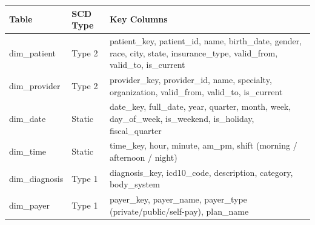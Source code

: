 \documentclass[12pt, a4paper, oneside]{report}
\begin{document}
\begin{longtable}{>{\ttfamily\small}p{2.8cm} p{2cm} p{8cm}}
    \toprule
    \normalfont\textbf{Table} & \textbf{SCD Type} & \textbf{Key Columns} \\
    \midrule
    \endhead
    dim\_patient & Type 2 & patient\_key, patient\_id, name, birth\_date, gender, race, city, state, insurance\_type, valid\_from, valid\_to, is\_current \\
    \midrule
    dim\_provider & Type 2 & provider\_key, provider\_id, name, specialty, organization, valid\_from, valid\_to, is\_current \\
    \midrule
    dim\_date & Static & date\_key, full\_date, year, quarter, month, week, day\_of\_week, is\_weekend, is\_holiday, fiscal\_quarter \\
    \midrule
    dim\_time & Static & time\_key, hour, minute, am\_pm, shift (morning / afternoon / night) \\
    \midrule
    dim\_diagnosis & Type 1 & diagnosis\_key, icd10\_code, description, category, body\_system \\
    \midrule
    dim\_payer & Type 1 & payer\_key, payer\_name, payer\_type (private/public/self-pay), plan\_name \\
    \bottomrule
\end{longtable}
\end{document}
